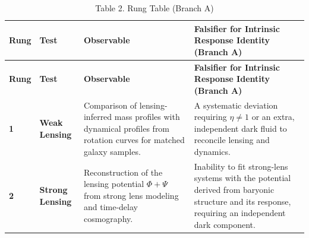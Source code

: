 \begin{longtable}[]{@{}
  >{\centering\arraybackslash}p{}
  >{\raggedright\arraybackslash}p{}
  >{\raggedright\arraybackslash}p{}
  >{\raggedright\arraybackslash}p{}@{}}
\caption{\protect{}\label{_Toc222952632}{}Table 2. Rung Table (Branch A)}\tabularnewline
\toprule\noalign{}
\begin{minipage}[b]{\linewidth}\centering
\textbf{Rung}
\end{minipage} & \begin{minipage}[b]{\linewidth}\centering
\textbf{Test}
\end{minipage} & \begin{minipage}[b]{\linewidth}\centering
\textbf{Observable}
\end{minipage} & \begin{minipage}[b]{\linewidth}\centering
\textbf{Falsifier for Intrinsic Response Identity (Branch A)}
\end{minipage} \\
\midrule\noalign{}
\endfirsthead
\toprule\noalign{}
\begin{minipage}[b]{\linewidth}\centering
\textbf{Rung}
\end{minipage} & \begin{minipage}[b]{\linewidth}\centering
\textbf{Test}
\end{minipage} & \begin{minipage}[b]{\linewidth}\centering
\textbf{Observable}
\end{minipage} & \begin{minipage}[b]{\linewidth}\centering
\textbf{Falsifier for Intrinsic Response Identity (Branch A)}
\end{minipage} \\
\midrule\noalign{}
\endhead
\bottomrule\noalign{}
\endlastfoot
\textbf{1} & \textbf{Weak Lensing} & Comparison of lensing-inferred mass profiles with dynamical profiles from rotation curves for matched galaxy samples. & A systematic deviation requiring \(\eta \neq 1\) or an extra, independent dark fluid to reconcile lensing and dynamics. \\
\textbf{2} & \textbf{Strong Lensing} & Reconstruction of the lensing potential \(\Phi + \Psi\) from strong lens modeling and time-delay cosmography. & Inability to fit strong-lens systems with the potential derived from baryonic structure and its response, requiring an independent dark component. \\

\end{longtable}
